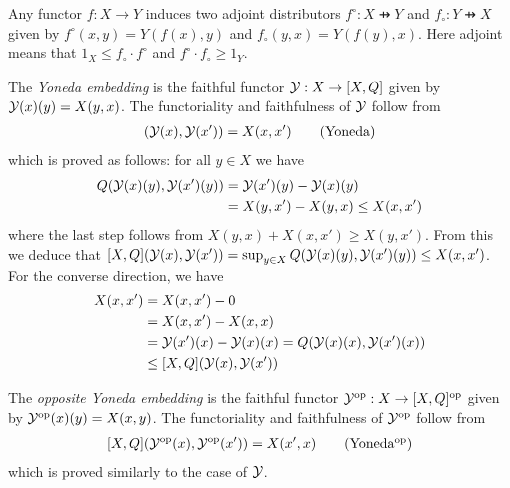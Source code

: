 Any functor $f:X\to Y$ induces two adjoint distributors $f^{\circ}:X\pfun Y$ and $f_{\circ}:Y\pfun X$ given by $f^{\circ}(x,y)=Y(f(x),y)$ and $f_{\circ}(y,x)=Y(f(y),x)$.
Here adjoint means that $1_{X}\leq f_{\circ}\cdot f^{\circ} $ and $f^{\circ}\cdot f_{\circ}\geq 1_{Y}$. 



\begin{remark}


The \emph{Yoneda embedding} is the faithful functor $\mathcal{Y}: X\to [X,Q]$ given by $\mathcal{Y}(x)(y)=X(y,x)$. The functoriality and faithfulness of $\mathcal{Y}$ follow from
\begin{align}
[X,Q](\C Y(x),\C Y(x'))= X(x,x') \tag{Yoneda}
\end{align}
which is proved as follows: for all $y\in X$ we have 
\begin{align*}
Q( \mathcal{Y}(x)(y),\mathcal{Y}(x')(y))&= \mathcal{Y}(x')(y)-\mathcal{Y}(x)(y) \\
&= X(y,x')-X(y,x) \leq X(x,x')
\end{align*}
where the last step follows from $X(y,x)+X(x,x')\geq X(y,x')$. 
From this we deduce that $[X,Q](\mathcal{Y}(x),\mathcal{Y}(x'))=\sup_{y\in X}Q( \mathcal{Y}(x)(y),\mathcal{Y}(x')(y))\leq X(x,x')$. 
For the converse direction, we have  
\begin{align*}
X(x,x') &  = X(x,x') - 0 \\ &=
X(x,x')- X(x,x)
\\& =\mathcal{Y}(x')(x)-\mathcal{Y}(x)(x)= Q(\mathcal{Y}(x)(x),\mathcal{Y}(x')(x))\\
&\leq [X,Q](\mathcal{Y}(x), \mathcal{Y}(x'))
\end{align*}
\end{remark}


\begin{remark}
The \emph{opposite Yoneda embedding} is the faithful functor
$\mathcal{Y}^{\mathrm{op}}: X\to [X,Q]^{\mathrm{op}}$ given by $\mathcal{Y}^{\mathrm{op}}(x)(y)=X(x,y)$. The functoriality and faithfulness of $\mathcal{Y}^{\mathrm{op}}$ follow from
\begin{align}\label{eq:yonedaop}
[X,Q](\C Y^{\mathrm{op}}(x),\C Y^{\mathrm{op}}(x'))= X(x',x) \tag{Yoneda$^{\mathrm{op}}$}
\end{align}
which is proved similarly to the case of $\mathcal{Y}$.
\end{remark}

